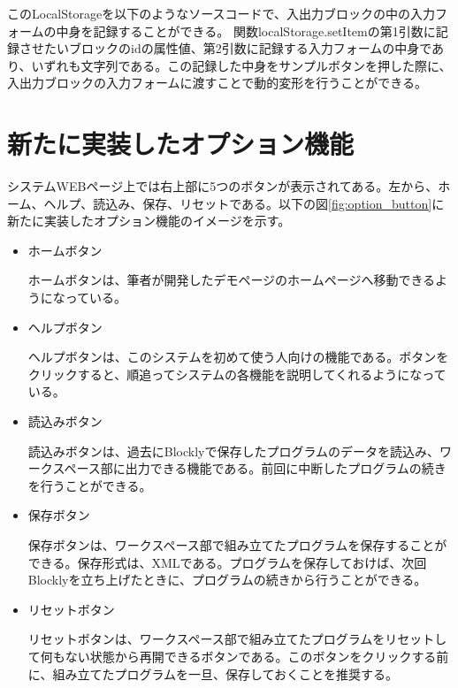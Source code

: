 \documentclass{eniepaper}
\begin{document}
このLocalStorageを以下のようなソースコードで、入出力ブロックの中の入力フォームの中身を記録することができる。	
関数localStorage.setItemの第1引数に記録させたいブロックのidの属性値、第2引数に記録する入力フォームの中身であり、いずれも文字列である。この記録した中身をサンプルボタンを押した際に、入出力ブロックの入力フォームに渡すことで動的変形を行うことができる。



   \section{新たに実装したオプション機能}
   
システムWEBページ上では右上部に5つのボタンが表示されてある。左から、ホーム、ヘルプ、読込み、保存、リセットである。以下の図\ref{fig:option_button}に新たに実装したオプション機能のイメージを示す。

\begin{itemize}

\item ホームボタン

ホームボタンは、筆者が開発したデモページのホームページへ移動できるようになっている。
  
\item ヘルプボタン

ヘルプボタンは、このシステムを初めて使う人向けの機能である。ボタンをクリックすると、順追ってシステムの各機能を説明してくれるようになっている。

\item 読込みボタン

読込みボタンは、過去にBlocklyで保存したプログラムのデータを読込み、ワークスペース部に出力できる機能である。前回に中断したプログラムの続きを行うことができる。

\item 保存ボタン

保存ボタンは、ワークスペース部で組み立てたプログラムを保存することができる。保存形式は、XMLである。プログラムを保存しておけば、次回Blocklyを立ち上げたときに、プログラムの続きから行うことができる。

\item リセットボタン

リセットボタンは、ワークスペース部で組み立てたプログラムをリセットして何もない状態から再開できるボタンである。このボタンをクリックする前に、組み立てたプログラムを一旦、保存しておくことを推奨する。

\end{itemize} 
\end{document}
